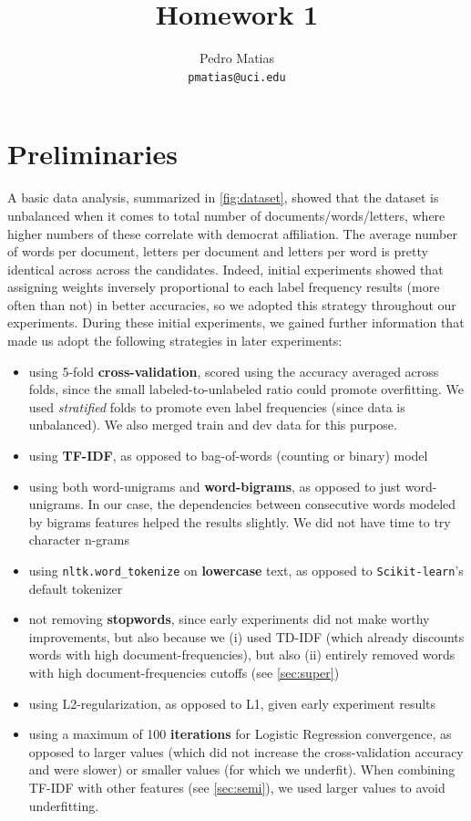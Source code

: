 \documentclass[11pt]{article}
\title{Homework 1}
\author{Pedro Matias \\
  \texttt{pmatias@uci.edu}}
\begin{document}
\maketitle
\section{Preliminaries}\label{sec:prelim}

A basic data analysis, summarized in \cref{fig:dataset}, showed that the dataset is unbalanced when it comes to total number of documents/words/letters, where higher numbers of these correlate with democrat affiliation. The average number of words per document, letters per document and letters per word is pretty identical across across the candidates. Indeed, initial experiments showed that assigning weights inversely proportional to each label frequency results (more often than not) in better accuracies, so we adopted this strategy throughout our experiments. During these initial experiments, we gained further information that made us adopt the following strategies in later experiments:

\begin{itemize}
  \item using 5-fold \textbf{cross-validation}, scored using the accuracy averaged across folds, since the small labeled-to-unlabeled ratio could promote overfitting. We used \textit{stratified} folds to promote even label frequencies (since data is unbalanced). We also merged train and dev data for this purpose.
  \item using \textbf{TF-IDF}, as opposed to bag-of-words (counting or binary) model
  \item using both word-unigrams and \textbf{word-bigrams}, as opposed to just word-unigrams. In our case, the dependencies between consecutive words modeled by bigrams features helped the results slightly. We did not have time to try character n-grams
  \item using \texttt{nltk.word\_tokenize} on \textbf{lowercase} text, as opposed to \texttt{Scikit-learn}'s default tokenizer
  \item not removing \textbf{stopwords}, since early experiments did not make worthy improvements, but also because we (i) used TD-IDF (which already discounts words with high document-frequencies), but also (ii) entirely removed words with high document-frequencies cutoffs (see \cref{sec:super})
  \item using L2-regularization, as opposed to L1, given early experiment results
  \item using a maximum of 100 \textbf{iterations} for Logistic Regression convergence, as opposed to larger values (which did not increase the cross-validation accuracy and were slower) or smaller values (for which we underfit). When combining TF-IDF with other features (see \cref{sec:semi}), we used larger values to avoid underfitting.
\end{itemize}
\end{document}
